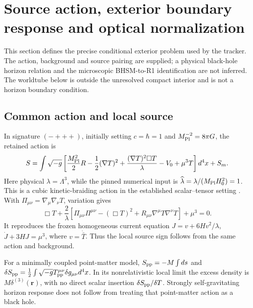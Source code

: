 \section{Source action, exterior boundary response and optical normalization}
\label{app:exterior-derivation}

This section defines the precise conditional exterior problem used by the
tracker. The action, background and source pairing are supplied; a physical
black-hole horizon relation and the microscopic BHSM-to-R1 identification
are not inferred. The worldtube below is outside the unresolved compact
interior and is not a horizon boundary condition.

\subsection{Common action and local source}

In signature $(-+++)$, initially setting $c=\hbar=1$ and
$M_{\rm Pl}^{-2}=8\pi G$, the retained action is
\begin{equation}
 S=\int\sqrt{-g}\left[\frac{M_{\rm Pl}^2}{2}R
 -\frac12(\nabla T)^2+\frac{(\nabla T)^2\Box T}{\lambda}
 -V_0+\mu^3T\right]d^4x+S_m .
 \label{eq:ext-action}
\end{equation}
Here physical $\lambda=\Lambda^3$, while the pinned numerical input is
$\widehat\lambda=\lambda/(M_{\rm Pl}H_0^2)=1$. This is a cubic
kinetic-braiding action in the established scalar--tensor setting
\cite{Deffayet2010,Kimura2012}. With
$\Pi_{\mu\nu}=\nabla_\mu\nabla_\nu T$, variation gives
\begin{equation}
 \Box T+\frac2\lambda\left[\Pi_{\mu\nu}\Pi^{\mu\nu}
 -(\Box T)^2+R_{\mu\nu}\nabla^\mu T\nabla^\nu T\right]+\mu^3=0.
 \label{eq:ext-scalar-euler}
\end{equation}
It reproduces the frozen homogeneous current equation
$J=v+6Hv^2/\lambda$, $\dot J+3HJ=\mu^3$, where $v=\dot{\bar T}$.
Thus the local source sign follows from the same action and background.

For a minimally coupled point-matter model,
$S_{\rm pp}=-M\int ds$ and
$\delta S_{\rm pp}=\tfrac12\int\sqrt{-g}T^{\mu\nu}_{\rm pp}
\delta g_{\mu\nu}d^4x$. In its nonrelativistic local limit the excess
density is $M\delta^{(3)}(\boldsymbol r)$, with no direct scalar insertion
$\delta S_{\rm pp}/\delta T$. Strongly self-gravitating horizon response
does not follow from treating that point-matter action as a black hole.

